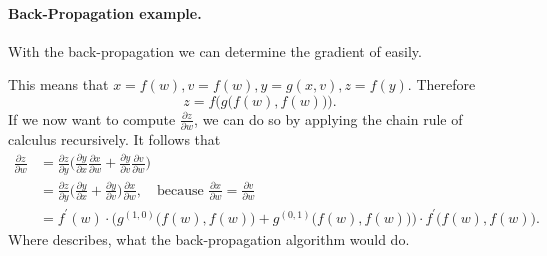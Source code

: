 \paragraph{Back-Propagation example.}
With the back-propagation we can determine the gradient of  easily.

This means that \(x = f(w), v = f(w), y = g(x,v), z = f(y)\).
Therefore
\begin{equation}
    z = f\Big( g \big( f(w),f(w) \big) \Big).
\end{equation}
If we now want to compute \(\frac{\partial z}{\partial w}\), we can do so by applying the chain rule of calculus recursively.
It follows that
\begin{align}
    \frac{\partial z}{\partial w} &= \frac{\partial z}{\partial y} \Bigg( \frac{\partial y}{\partial x} \frac{\partial x}{\partial w} + \frac{\partial y}{\partial v} \frac{\partial v}{\partial w} \Bigg) \label{eq:back-prop-example} \\
    &= \frac{\partial z}{\partial y} \Bigg( \frac{\partial y}{\partial x} + \frac{\partial y}{\partial v} \Bigg) \frac{\partial x}{\partial w}, \quad \text{because } \frac{\partial x}{\partial w} = \frac{\partial v}{\partial w} \\
    &= f^\prime (w) \cdot \Big( g^{(1,0)} \big( f(w), f(w) \big) + g^{(0,1)} \big( f(w), f(w) \big) \Big) \cdot f^\prime \big( f(w), f(w)\big).
\end{align}
Where  describes, what the back-propagation algorithm would do.